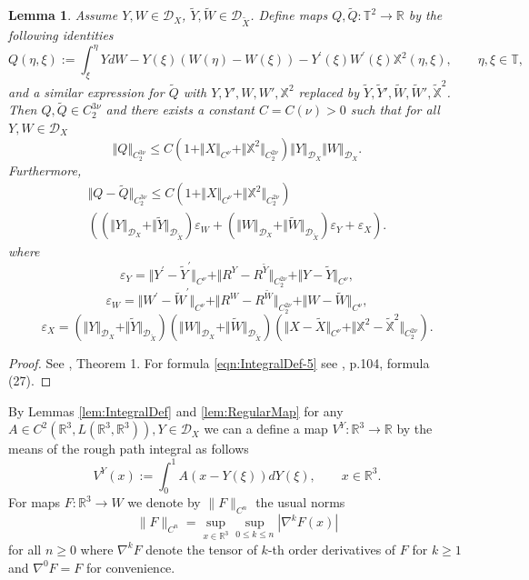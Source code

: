 \documentclass[11pt,a4paper,reqno]{amsart}%
\theoremstyle{plain}
\theoremstyle{remark}
\theoremstyle{plain}
\newtheorem{lemma}[theorem]{Lemma}
\numberwithin{equation}{section}
\newcommand{\eps}{\varepsilon}
\def\Rnu{{\mathbb R}}
\begin{document}
\begin{lemma}\label{lem:IntegralProp}
Assume $Y,W\in \mathcal{D}_X$, $\tilde{Y},\tilde{W}\in
\mathcal{D}_{\tilde{X}}$. Define maps $Q,\tilde{Q}:\mathbb{T}^2\to\Rnu$ by
the following identities
\begin{equation}
Q(\eta,\xi):=\int_{\xi}^{\eta}YdW-Y(\xi)(W(\eta)-W(\xi))-Y^\prime(\xi)W^\prime(\xi)\mathbb{X}^2(\eta,\xi),\qquad\eta,\xi\in
\mathbb{T},\label{eqn:IntegralDef-2}
\end{equation}
and a similar expression for $\tilde{Q}$ with $Y,Y',W,W',\mathbb{X}^2$ replaced by $\tilde{Y},\tilde{Y}',\tilde{W},\tilde{W}',\tilde{\mathbb{X}}^2$.
Then $Q,\tilde{Q}\in C_2^{3\nu}$ and there exists a constant
$C=C(\nu)>0$ such that for all $Y,W\in \mathcal{D}_X$
\begin{equation}
\Vert Q\Vert_{C_2^{3\nu}}\leq
C(1+\Vert X\Vert_{C^{\nu}}+\Vert \mathbb{X}^2\Vert_{C_2^{2\nu}})\Vert Y\Vert_{\mathcal{D}_X}\Vert W\Vert_{\mathcal{D}_X}.\label{eqn:IntegralDef-3}
\end{equation}
Furthermore,
\begin{multline}\label{eqn:IntegralDef-5}
\Vert Q-\tilde{Q}\Vert_{C_2^{3\nu}}\leq
C(1+\Vert X\Vert_{C^{\nu}}+\Vert \mathbb{X}^2\Vert_{C_2^{2\nu}})\\
((\Vert Y\Vert_{\mathcal{D}_X}+\Vert \tilde{Y}\Vert_{\mathcal{D}_{\tilde{X}}})\eps_W+
(\Vert W\Vert_{\mathcal{D}_X}+\Vert \tilde{W}\Vert_{\mathcal{D}_{\tilde{X}}})\eps_Y+\eps_X).
\end{multline}
where
\[
\eps_Y=\Vert Y^\prime-\tilde{Y}^\prime\Vert_{C^{\nu}}+\Vert R^Y-R^{\tilde{Y}}\Vert_{C_2^{2\nu}}+\Vert Y-\tilde{Y}\Vert_{C^{\nu}},
\]
\[
\eps_W=\Vert W^\prime-\tilde{W}^\prime\Vert_{C^{\nu}}+\Vert R^W-R^{\tilde{W}}\Vert_{C_2^{2\nu}}+\Vert W-\tilde{W}\Vert_{C^{\nu}},
\]
\[
\eps_X=(\Vert Y\Vert_{\mathcal{D}_X}+\Vert \tilde{Y}\Vert_{\mathcal{D}_{\tilde{X}}})(\Vert W\Vert_{\mathcal{D}_X}+\Vert \tilde{W}\Vert_{\mathcal{D}_{\tilde{X}}})
(\Vert X-\tilde{X}\Vert_{C^{\nu}}+\Vert \mathbb{X}^2-\mathbb{\tilde{X}}^2\Vert_{C_2^{2\nu}}).
\]
\end{lemma}
\begin{proof}%
See \cite{[Gubinelli-2004]}, Theorem 1. For formula
\eqref{eqn:IntegralDef-5} see   \cite{[Gubinelli-2004]}, p.104,
formula (27).
\end{proof}
By Lemmas \ref{lem:IntegralDef} and \ref{lem:RegularMap} for any
$A\in C^2(\Rnu^3,L(\Rnu^3,\Rnu^3)),Y\in\mathcal{D}_X$ we can a
define a map  $V^Y:\Rnu^3\to\Rnu$  by the means of the rough path integral as follows
\begin{equation}
V^Y(x):=\int_{0}^1A(x-Y(\xi))d Y(\xi),\qquad x\in\Rnu^3.
\end{equation}
For maps $F:\mathbb{R}^3\to W$ we denote by $\|F\|_{C^n}$ the usual norms 
$$
\|F\|_{C^n} = \sup_{x\in\mathbb{R}^3} \sup_{0\le k\le n}|\nabla^k F(x)|
$$
for all $n\ge 0$ where $\nabla^k F$ denote the tensor of $k$-th order derivatives of $F$ for $k\ge 1$ and $\nabla^0 F = F$ for convenience.
\end{document}
